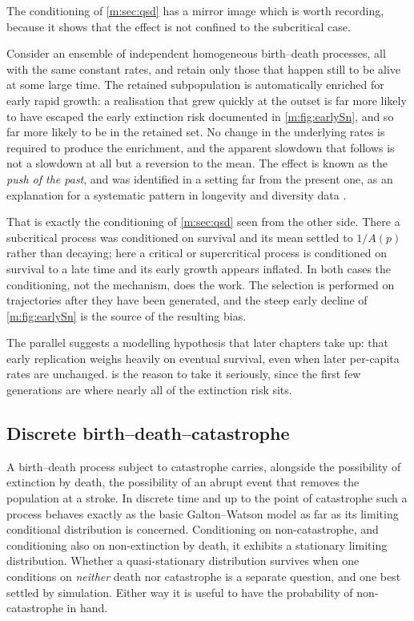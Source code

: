 The conditioning of \cref{m:sec:qsd} has a mirror image which is worth recording,
because it shows that the effect is not confined to the subcritical case.

Consider an ensemble of independent homogeneous birth--death processes, all with
the same constant rates, and retain only those that happen still to be alive at
some large time. The retained subpopulation is automatically enriched for early
rapid growth: a realisation that grew quickly at the outset is far more likely to
have escaped the early extinction risk documented in \cref{m:fig:earlySn}, and so far
more likely to be in the retained set. No change in the underlying rates is
required to produce the enrichment, and the apparent slowdown that follows is not a
slowdown at all but a reversion to the mean. The effect is known as the \emph{push
of the past}, and was identified in a setting far from the present one, as an
explanation for a systematic pattern in longevity and diversity data
\cite{Budd2018}.

That is exactly the conditioning of \cref{m:sec:qsd} seen from the other side. There
a subcritical process was conditioned on survival and its mean settled to $1/A(p)$
rather than decaying; here a critical or supercritical process is conditioned on
survival to a late time and its early growth appears inflated. In both cases the
conditioning, not the mechanism, does the work. The selection is performed on
trajectories after they have been generated, and the steep early decline of
\cref{m:fig:earlySn} is the source of the resulting bias.

The parallel suggests a modelling hypothesis that later chapters take up: that
early replication weighs heavily on eventual survival, even when later per-capita
rates are unchanged.  is the reason to take it seriously, since
the first few generations are where nearly all of the extinction risk sits.

\subsection{Discrete birth--death--catastrophe}
\label{m:sec:bdc}

A birth--death process subject to catastrophe carries, alongside the possibility of
extinction by death, the possibility of an abrupt event that removes the population
at a stroke. In discrete time and up to the point of catastrophe such a process
behaves exactly as the basic Galton--Watson model as far as its limiting
conditional distribution is concerned. Conditioning on non-catastrophe, and
conditioning also on non-extinction by death, it exhibits a stationary limiting
distribution. Whether a quasi-stationary distribution survives when one conditions
on \emph{neither} death nor catastrophe is a separate question, and one best
settled by simulation. Either way it is useful to have the probability of
non-catastrophe in hand.

